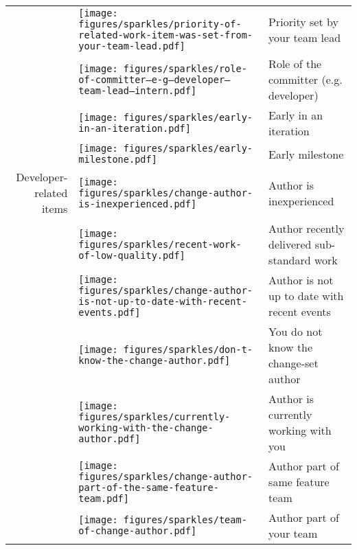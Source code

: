 \begin{table}[t!]
\begin{tabular}{rll}
&\vspace{-2pt}\texttt{[image: figures/sparkles/priority-of-related-work-item-was-set-from-your-team-lead.pdf]} & Priority set by your team lead\\
&\vspace{-2pt}\texttt{[image: figures/sparkles/role-of-committer--e-g--developer--team-lead--intern.pdf]} & Role of the committer (e.g. developer)\\
&\vspace{-2pt}\texttt{[image: figures/sparkles/early-in-an-iteration.pdf]} & Early in an iteration\\
&\vspace{-2pt}\texttt{[image: figures/sparkles/early-milestone.pdf]} & Early milestone\\
\midrule
Developer-related items&\vspace{-2pt}\texttt{[image: figures/sparkles/change-author-is-inexperienced.pdf]} & Author is inexperienced\\
&\vspace{-2pt}\texttt{[image: figures/sparkles/recent-work-of-low-quality.pdf]} & Author recently delivered sub-standard work\\
&\vspace{-2pt}\texttt{[image: figures/sparkles/change-author-is-not-up-to-date-with-recent-events.pdf]} & Author is not up to date with recent events\\
&\vspace{-2pt}\texttt{[image: figures/sparkles/don-t-know-the-change-author.pdf]} & You do not know the change-set author \\
&\vspace{-2pt}\texttt{[image: figures/sparkles/currently-working-with-the-change-author.pdf]} & Author is currently working with you\\
&\vspace{-2pt}\texttt{[image: figures/sparkles/change-author-part-of-the-same-feature-team.pdf]} & Author part of same feature team\\
&\vspace{-2pt}\texttt{[image: figures/sparkles/team-of-change-author.pdf]} & Author part of your team\\

\end{tabular}
\end{table}
